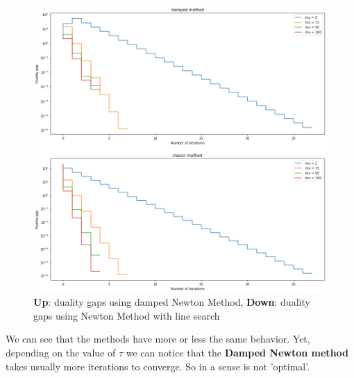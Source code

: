 \documentclass[11pt]{article}
\numberwithin{figure}{section} %
\begin{document}
\begin{figure}[H] 
	\centering
	\includegraphics[width=\textwidth]{images/duality_gaps.png}
	\caption{\textbf{Up}: duality gaps using damped Newton Method, \textbf{Down}: duality gaps using Newton Method with line search}
	\label{fig:duality_g}
\end{figure}

We can see that the methods have more or less the same behavior. Yet, depending on the value of $\tau$ we can notice that the \textbf{Damped Newton method} takes usually more iterations to converge. So in a sense is not 'optimal'.
\end{document}
